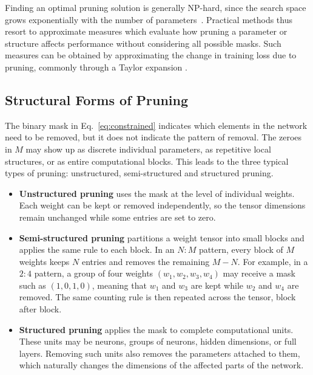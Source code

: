 Finding an optimal pruning solution is generally NP-hard, since the search
space grows exponentially with the number of parameters~\cite{dong2017learning}.
Practical methods thus resort to approximate measures which evaluate how pruning a parameter or structure affects performance without considering all possible masks. Such measures can be obtained by approximating the change in training loss due to pruning, commonly through a Taylor expansion \cite{molchanov2017variational}.

\subsection{Structural Forms of Pruning}
\label{sec:pruning_structures}

The binary mask in Eq.~\eqref{eq:constrained} indicates which elements in
the network need to be removed, but it does not indicate the pattern of
removal. The zeroes in $M$ may show up as discrete individual parameters, as
repetitive local structures, or as entire computational blocks. This leads to
the three typical types of pruning: unstructured, semi-structured and
structured pruning.

\begin{itemize}
    \item \textbf{Unstructured pruning} uses the mask at the level of
    individual weights. Each weight can be kept or removed independently, so
    the tensor dimensions remain unchanged while some entries are set to zero.

    \item \textbf{Semi-structured pruning} partitions a weight tensor into
    small blocks and applies the same rule to each block. In an $N\!:\!M$
    pattern, every block of $M$ weights keeps $N$ entries and removes the
    remaining $M-N$. For example, in a $2\!:\!4$ pattern, a group of four
    weights $(w_1,w_2,w_3,w_4)$ may receive a mask such as $(1,0,1,0)$,
    meaning that $w_1$ and $w_3$ are kept while $w_2$ and $w_4$ are removed.
    The same counting rule is then repeated across the tensor, block after
    block.

    \item \textbf{Structured pruning} applies the mask to complete
    computational units. These units may be neurons, groups of neurons,
    hidden dimensions, or full layers. Removing such units also removes the
    parameters attached to them, which naturally changes the dimensions of the
    affected parts of the network.
\end{itemize}

